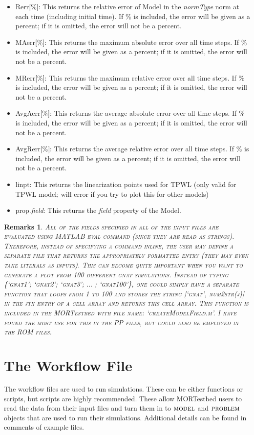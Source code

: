 \documentclass[notitlepage]{report}
\newtheorem*{Rem}{Remarks}
\newcommand{\model}{\ensuremath{\textsc{model }}}
\newcommand{\problem}{\ensuremath{\textsc{problem }}}
\begin{document}
\begin{itemize}
  \item Rerr[\%]: This returns the relative error of Model in the \textit{normType} norm at each time (including initial time). If $\%$ is included, the error will be given as a percent; if it is omitted, the error will not be a percent.
  \item MAerr[\%]: This returns the maximum absolute error over all time steps. If $\%$ is included, the error will be given as a percent; if it is omitted, the error will not be a percent.
  \item MRerr[\%]: This returns the maximum relative error over all time steps. If $\%$ is included, the error will be given as a percent; if it is omitted, the error will not be a percent.
  \item AvgAerr[\%]: This returns the average absolute error over all time steps. If $\%$ is included, the error will be given as a percent; if it is omitted, the error will not be a percent.
  \item AvgRerr[\%]: This returns the average relative error over all time steps. If $\%$ is included, the error will be given as a percent; if it is omitted, the error will not be a percent.
  \item linpt: This returns the linearization points used for TPWL (only valid for TPWL model; will error if you try to plot this for other models)
  \item prop.\textit{field}: This returns the \textit{field} property of the Model.
\end{itemize}

\begin{Rem}
 \textsc{All of the fields specified in all of the input files are evaluated using MATLAB eval command (since they are read as strings).  Therefore, instead of specifying a command inline, the user may define a separate file that returns the appropriately formatted entry (they may even take literals as inputs).  This can become quite important when you want to generate a plot from 100 different gnat simulations.  Instead of typing \{`gnat1'; `gnat2'; `gnat3'; $\dots$ ; `gnat100'\}, one could simply have a separate function that loops from 1 to 100 and stores the string [`gnat', num2str(j)] in the jth entry of a cell array and returns this cell array.  This function is included in the MORTestbed with file name: `createModelField.m'.  I have found the most use for this in the PP files, but could also be employed in the ROM files.}
\end{Rem}

\section{The Workflow File} \label{sec:wkflow}
The workflow files are used to run simulations.  These can be either functions or scripts, but scripts are highly recommended.  These allow MORTestbed users to read the data from their input files and turn them in to \model and \problem objects that are used to run their simulations.  Additional details can be found in comments of example files.
\end{document}
